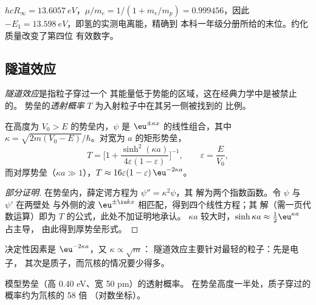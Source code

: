 \begin{example}[氢的电离能]\label{ex:b3:quantum-model-systems:ie}
$hcR_\infty = \qty{13.6057}{eV}$，$\mu/m_e = 1/(1 + m_e/m_p) = 0.999456$，因此
$-E_1 = \qty{13.598}{eV}$，即氢的实测电离能，精确到
本科一年级分册所给的末位。约化质量改变了第四位
有效数字。
\end{example}

\subsection*{隧道效应}

\begin{definition}\label{def:b3:quantum-model-systems:tunnelling}
\emph{隧道效应}是指粒子穿过一个
其能量低于势能的区域，这在经典力学中是被禁止的。
势垒的\emph{透射概率}
$T$ 为入射粒子中在其另一侧被找到的
比例。
\end{definition}

\begin{proposition}[薄势垒与厚势垒]\label{prop:b3:quantum-model-systems:barrier}
在高度为 $V_0 > E$ 的势垒内，$\psi$ 是
$\eu^{\pm\kappa x}$ 的线性组合，其中 $\kappa = \sqrt{2m(V_0 - E)}/\hbar$。对宽为
$a$ 的矩形势垒，
\[
T = \Big[1 + \frac{\sinh^2(\kappa a)}{4\varepsilon(1-\varepsilon)}\Big]^{-1},
\qquad \varepsilon = \frac{E}{V_0},
\]
而对厚势垒（$\kappa a \gg 1$），$T \approx 16\varepsilon(1-\varepsilon)
\,\eu^{-2\kappa a}$。
\end{proposition}

\begin{proof}[部分证明]
在势垒内，薛定谔方程为 $\psi'' = \kappa^2\psi$，其
解为两个指数函数。令 $\psi$ 与 $\psi'$ 在两壁处
与外侧的波 $\eu^{\pm\iu kx}$ 相匹配，得到四个线性方程；其
解（需一页代数运算）即为 $T$ 的公式，此处不加证明地承认。
$\kappa a$ 较大时，$\sinh\kappa a \approx \frac12\eu^{\kappa a}$ 占主导，
由此得到厚势垒形式。
\end{proof}

决定性因素是 $\eu^{-2\kappa a}$，又 $\kappa \propto \sqrt m$：
隧道效应主要针对最轻的粒子：先是电子，
其次是质子，而氘核的情况要少得多。

\begin{omfigure}

{\small 模型势垒（高 0.40 eV、宽 50 pm）的透射概率。
在势垒高度一半处，质子穿过的概率约为氘核的 58 倍
（对数坐标）。}
\end{omfigure}

